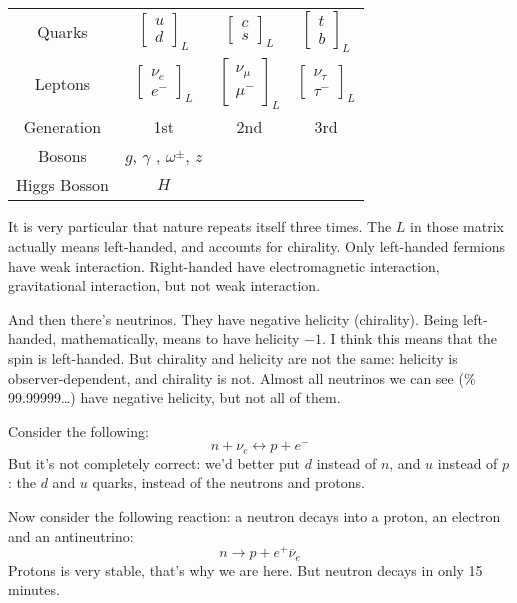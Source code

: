 \begin{tabular}{c c c c}
Quarks & $\begin{bmatrix} u\\d \end{bmatrix}_L $ & $\begin{bmatrix} c\\s
\end{bmatrix}_L$ & $\begin{bmatrix} t\\b \end{bmatrix}_L$\\
Leptons & $\begin{bmatrix} \nu_e\\e^- \end{bmatrix}_L $ & $\begin{bmatrix}
\nu_\mu\\ \mu^-
\end{bmatrix}_L$ & $\begin{bmatrix} \nu_\tau\\ \tau^- \end{bmatrix}_L$\\
Generation & 1st & 2nd & 3rd\\
Bosons & $g$, $\gamma$ , $\omega^\pm$, $z$ \\
Higgs Bosson & $H$
\end{tabular}

\medskip

It is very particular that nature repeats itself three times. The $L$ in those
matrix actually means left-handed, and accounts for chirality. Only left-handed
fermions have weak interaction. Right-handed have electromagnetic interaction,
gravitational interaction, but not weak interaction.

And then there's neutrinos. They have negative helicity (chirality). Being
left-handed, mathematically, means to have helicity $-1$. I think this means
that the spin is left-handed. But chirality and helicity are not the same:
helicity is observer-dependent, and chirality is not. Almost all neutrinos we
can see (\% 99.99999…) have negative helicity, but not all of them.

Consider the following:
$$
n+\nu_e\leftrightarrow p+e^-
$$
But it's not completely correct: we'd better put $d$ instead of $n$, and $u$
instead of $p$: the $d$ and $u$ quarks, instead of the neutrons and protons.

Now consider the following reaction: a neutron decays into a proton, an electron
and an antineutrino:
$$
n\to p+e^+\overline{\nu}_e
$$
Protons is very stable, that's why we are here. But neutron decays in only 15
minutes.

